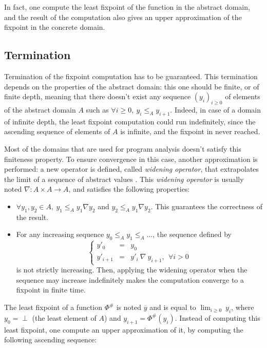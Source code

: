 \documentclass[a4paper,english,titlepage,11pt]{article}
\begin{document}
In fact, one compute the least fixpoint of the function in the abstract
domain, and the result of the computation also gives an upper approximation of
the fixpoint in the concrete domain.


\subsection{Termination}

Termination of the fixpoint computation has to be guaranteed. This termination
depends on the properties of the abstract domain:
this one should be finite, or of finite depth, meaning that there doesn't exist
any sequence $(y_i)_{i \geq 0}$ of elements of the abstract domain $A$ such as
$\forall i \geq 0,\ y_i \leq_A y_{i+1}$. Indeed, in case of a domain of infinite
depth, the least fixpoint
computation could run indefinitely, since the ascending sequence of elements of
$A$ is infinite, and the fixpoint in never reached.


Most of the domains that are used for program analysis doesn't satisfy this
finiteness property. To ensure convergence in this case, another approximation
is performed: a new operator is defined, called \emph{widening operator}, that
extrapolates the limit of a sequence of abstract values
\cite{CC77,CousotCousot92-4}. This \emph{widening
operator} is usually noted $\nabla: A \times A \rightarrow A$, and satisfies
the following properties:

\begin{itemize}
\item $\forall y_1, y_2 \in A,\ y_1 \leq_A y_1 \nabla y_2$ and $y_2 \leq_A y_1
\nabla y_2$. This guarantees the correctness of the result.
\item For any increasing sequence $y_0 \leq_A y_1 \leq_A \dots$, the sequence
defined by 
$$\left\{ \begin{array}{rll}
y'_0 & = &  y_0 \\
y'_{i+1} & = &  y'_i\ \nabla\ y_{i+1},\ \  \forall i > 0
\end{array} \right.$$
is not strictly increasing. Then, applying the widening operator when the
sequence may increase indefinitely makes the computation converge to a fixpoint
in finite time. 
\end{itemize}

The least fixpoint of a function $\Phi^\#$ is noted $\overline{y}$ and is equal
to $\displaystyle \lim_{i \geq 0}\ y_i$, where $y_0 = \perp$ (the least element
of $A$) and $y_{i+1} = \Phi^\# (y_i)$. Instead of computing this least fixpoint,
one compute an upper approximation of it, by computing the following ascending
sequence:
\end{document}
